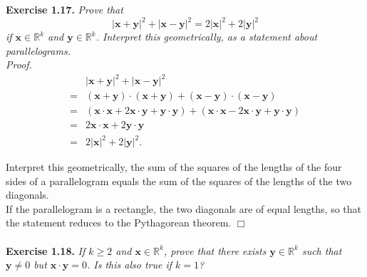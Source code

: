 \documentclass{article}
\begin{document}



\textbf{Exercise 1.17.}
\emph{Prove that
$$|\mathbf{x}+\mathbf{y}|^2 + |\mathbf{x}-\mathbf{y}|^2
= 2|\mathbf{x}|^2 + 2|\mathbf{y}|^2$$
if $\mathbf{x} \in \mathbb{R}^k$ and $\mathbf{y} \in \mathbb{R}^k$.
Interpret this geometrically,
as a statement about parallelograms.} \\

\emph{Proof.}
\begin{align*}
&|\mathbf{x}+\mathbf{y}|^2 + |\mathbf{x}-\mathbf{y}|^2 \\
=& (\mathbf{x}+\mathbf{y})\cdot(\mathbf{x}+\mathbf{y})
  + (\mathbf{x}-\mathbf{y})\cdot(\mathbf{x}-\mathbf{y}) \\
=& (\mathbf{x}\cdot\mathbf{x} + 2\mathbf{x}\cdot\mathbf{y} + \mathbf{y}\cdot\mathbf{y})
  + (\mathbf{x}\cdot\mathbf{x} - 2\mathbf{x}\cdot\mathbf{y} + \mathbf{y}\cdot\mathbf{y}) \\
=& 2\mathbf{x}\cdot\mathbf{x} + 2\mathbf{y}\cdot\mathbf{y} \\
=& 2|\mathbf{x}|^2 + 2|\mathbf{y}|^2.
\end{align*}

Interpret this geometrically,
the sum of the squares of the lengths of the four sides of a parallelogram
equals the sum of the squares of the lengths of the two diagonals. \\

If the parallelogram is a rectangle, the two diagonals are of equal lengths,
so that the statement reduces to the Pythagorean theorem.
$\Box$ \\\\






\textbf{Exercise 1.18.}
\emph{If $k \geq 2$ and $\mathbf{x} \in \mathbb{R}^k$,
prove that there exists $\mathbf{y} \in \mathbb{R}^k$ such that
$\mathbf{y} \neq 0$ but $\mathbf{x} \cdot \mathbf{y} = 0$.
Is this also true if $k = 1$?} \\
\end{document}
